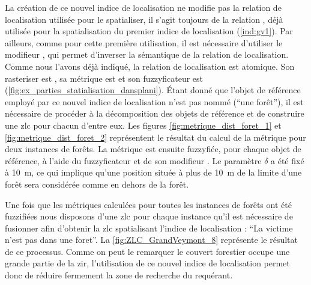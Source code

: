 La création de ce nouvel indice de localisation ne modifie pas la
relation de localisation utilisée pour le spatialiser, il s'agit
toujours de la relation , déjà utilisée
pour la spatialisation du premier indice de localisation
(\ref{ind:gv1}). Par ailleurs, comme pour cette première utilisation,
il est nécessaire d'utiliser le modifieur , qui permet
d'inverser la sémantique de la relation de localisation. Comme nous
l'avons déjà indiqué, la relation de localisation
 est atomique. Son rasteriser est
, sa métrique est  et son
fuzzyficateur est 
(\autoref{fig:ex_parties_statialisation_dansplani}). Étant donné que
l'objet de référence employé par ce nouvel indice de localisation
n'est pas nommé (\enquote{une forêt}), il est nécessaire de procéder à
la décomposition des objets de référence et de construire une \ac{zlc}
pour chacun d'entre eux. Les figures \ref{fig:metrique_dist_foret_1}
et \ref{fig:metrique_dist_foret_2} représentent le résultat du calcul
de la métrique  pour deux instances de forêts. La
métrique est ensuite fuzzyfiée, pour chaque objet de référence, à
l'aide du fuzzyficateur  et de son modifieur
. Le paramètre \(\delta\) a été fixé à \SI{10}{\meter},
ce qui implique qu'une position située à plus de \SI{10}{\meter} de la
limite d'une forêt sera considérée comme en dehors de la forêt.

Une fois que les métriques calculées pour toutes les instances de
forêts ont été fuzzifiées nous disposons d'une \ac{zlc} pour chaque
instance qu'il est nécessaire de fusionner afin d'obtenir la \ac{zlc}
spatialisant l'indice de localisation : \enquote{La victime n'est pas
  dans une foret}. La \autoref{fig:ZLC_GrandVeymont_8} représente le
résultat de ce processus. Comme on peut le remarquer le couvert
forestier occupe une grande partie de la \ac{zir}, l'utilisation de ce
nouvel indice de localisation permet donc de réduire fermement la zone
de recherche du requérant.

